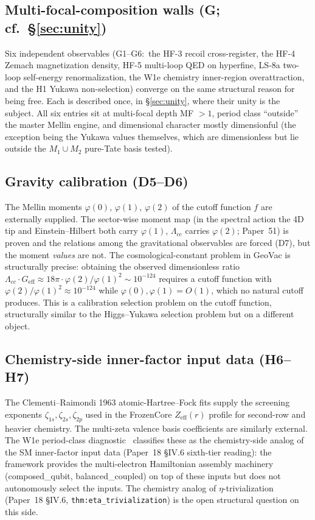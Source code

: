 \documentclass[11pt,a4paper]{article}
\theoremstyle{plain}
\theoremstyle{definition}
\newcommand{\reff}{Z_{\mathrm{eff}}}
\begin{document}
\subsection{Multi-focal-composition walls (G; cf.\ \S\ref{sec:unity})}
\label{sec:free_multifocal}

Six independent observables (G1--G6:\ the HF-3 recoil cross-register, the HF-4 Zemach magnetization density, HF-5 multi-loop QED on hyperfine, LS-8a two-loop self-energy renormalization, the W1e chemistry inner-region overattraction, and the H1 Yukawa non-selection) converge on the same structural reason for being free. Each is described once, in \S\ref{sec:unity}, where their unity is the subject. All six entries sit at multi-focal depth MF $> 1$, period class ``outside'' the master Mellin engine, and dimensional character mostly dimensionful (the exception being the Yukawa values themselves, which are dimensionless but lie outside the $M_1 \cup M_2$ pure-Tate basis tested).

\subsection{Gravity calibration (D5--D6)}
\label{sec:free_gravity}

The Mellin moments $\varphi(0)$, $\varphi(1)$, $\varphi(2)$ of the cutoff function $f$ are externally supplied. The sector-wise moment map (in the spectral action the 4D tip and Einstein--Hilbert both carry $\varphi(1)$, $\Lambda_{cc}$ carries $\varphi(2)$; Paper~51) is proven and the relations among the gravitational observables are forced (D7), but the moment \emph{values} are not. The cosmological-constant problem in GeoVac is structurally precise:  obtaining the observed dimensionless ratio $\Lambda_{cc} \cdot G_{\mathrm{eff}} \approx 18 \pi \cdot \varphi(2)/\varphi(1)^2 \sim 10^{-124}$ requires a cutoff function with $\varphi(2)/\varphi(1)^2 \approx 10^{-124}$ while $\varphi(0), \varphi(1) = O(1)$, which no natural cutoff produces. This is a calibration selection problem on the cutoff function, structurally similar to the Higgs--Yukawa selection problem but on a different object.

\subsection{Chemistry-side inner-factor input data (H6--H7)}
\label{sec:free_chem_inner}

The Clementi--Raimondi 1963 atomic-Hartree--Fock fits supply the screening exponents $\zeta_{1s}, \zeta_{2s}, \zeta_{2p}$ used in the FrozenCore $\reff(r)$ profile for second-row and heavier chemistry. The multi-zeta valence basis coefficients are similarly external. The W1e period-class diagnostic~\cite{debug_w1e} classifies these as the chemistry-side analog of the SM inner-factor input data (Paper~18 \S IV.6 sixth-tier reading):  the framework provides the multi-electron Hamiltonian assembly machinery (composed\_qubit, balanced\_coupled) on top of these inputs but does not autonomously select the inputs. The chemistry analog of $\eta$-trivialization (Paper~18 \S IV.6, \texttt{thm:eta\_trivialization}) is the open structural question on this side.
\end{document}
